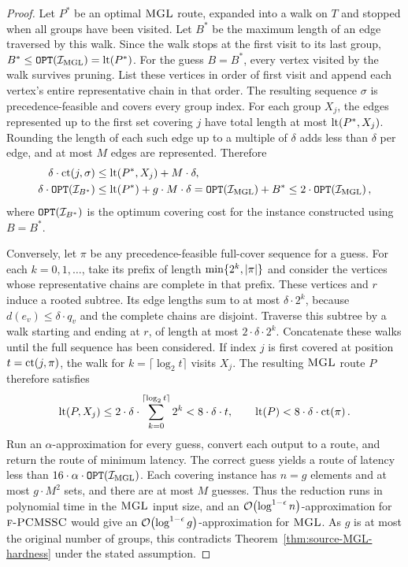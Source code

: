 \begin{proof}
    Let $P^*$ be an optimal $\textup{\textsc{MGL}}$ route, expanded into a walk on $T$ and stopped when all groups have been visited. Let $B^*$ be the maximum length of an edge traversed by this walk. Since the walk stops at the first visit to its last group, $B^*\leq\texttt{OPT}\mathopen{}\left( \mathcal{I}_{\mathrm{MGL}} \right)=\operatorname{lt}\mathopen{}\left( P^* \right)$. For the guess $B=B^*$, every vertex visited by the walk survives pruning. List these vertices in order of first visit and append each vertex's entire representative chain in that order. The resulting sequence $\sigma$ is precedence-feasible and covers every group index. For each group $X_j$, the edges represented up to the first set covering $j$ have total length at most $\operatorname{lt}\mathopen{}\left( P^*,X_j \right)$. Rounding the length of each such edge up to a multiple of $\delta$ adds less than $\delta$ per edge, and at most $M$ edges are represented. Therefore
    \begin{align*}
        \delta\cdot\operatorname{ct}\mathopen{}\left( j,\sigma \right)&\leq\operatorname{lt}\mathopen{}\left( P^*,X_j \right)+M\cdot\delta,\\
        \delta\cdot\texttt{OPT}\mathopen{}\left( \mathcal{I}_{B^*} \right)&\leq\operatorname{lt}\mathopen{}\left( P^* \right)+g\cdot M\cdot\delta
        =\texttt{OPT}\mathopen{}\left( \mathcal{I}_{\mathrm{MGL}} \right)+B^*\leq2\cdot\texttt{OPT}\mathopen{}\left( \mathcal{I}_{\mathrm{MGL}} \right),
    \end{align*}
    where $\texttt{OPT}\mathopen{}\left( \mathcal{I}_{B^*} \right)$ is the optimum covering cost for the instance constructed using $B=B^*$.

    Conversely, let $\pi$ be any precedence-feasible full-cover sequence for a guess. For each $k=0,1,\ldots$, take its prefix of length $\min\{2^k,\mathopen{}\left| \pi \right|\}$ and consider the vertices whose representative chains are complete in that prefix. These vertices and $r$ induce a rooted subtree. Its edge lengths sum to at most $\delta\cdot2^k$, because $d(e_v)\leq\delta\cdot q_v$ and the complete chains are disjoint. Traverse this subtree by a walk starting and ending at $r$, of length at most $2\cdot\delta\cdot2^k$. Concatenate these walks until the full sequence has been considered. If index $j$ is first covered at position $t=\operatorname{ct}\mathopen{}\left( j,\pi \right)$, the walk for $k=\lceil\log_2 t\rceil$ visits $X_j$. The resulting $\textup{\textsc{MGL}}$ route $P$ therefore satisfies
    \[
        \operatorname{lt}\mathopen{}\left( P,X_j \right)\leq2\cdot\delta\cdot\sum_{k=0}^{\lceil\log_2 t\rceil}2^k<8\cdot\delta\cdot t,
        \qquad
        \operatorname{lt}\mathopen{}\left( P \right)<8\cdot\delta\cdot\operatorname{ct}\mathopen{}\left( \pi \right).
    \]
    Run an $\alpha$-approximation for every guess, convert each output to a route, and return the route of minimum latency. The correct guess yields a route of latency less than $16\cdot\alpha\cdot\texttt{OPT}\mathopen{}\left( \mathcal{I}_{\mathrm{MGL}} \right)$. Each covering instance has $n=g$ elements and at most $g\cdot M^2$ sets, and there are at most $M$ guesses. Thus the reduction runs in polynomial time in the $\textup{\textsc{MGL}}$ input size, and an $\mathcal{O}\mathopen{}\left( \log^{1-\epsilon}n \right)$-approximation for $\textup{\textsc{f-PCMSSC}}$ would give an $\mathcal{O}\mathopen{}\left( \log^{1-\epsilon}g \right)$-approximation for $\textup{\textsc{MGL}}$. As $g$ is at most the original number of groups, this contradicts Theorem~\ref{thm:source-MGL-hardness} under the stated assumption.
\end{proof}

